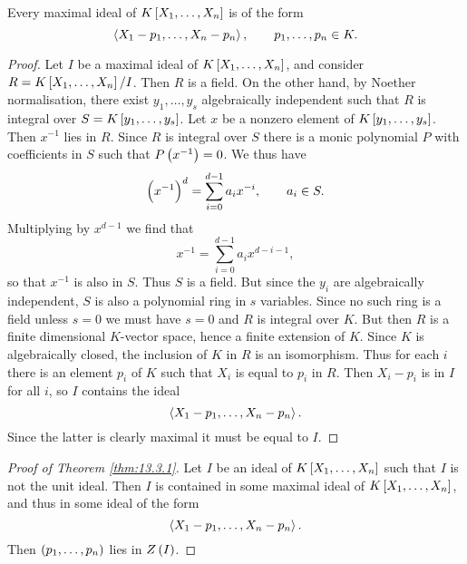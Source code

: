 
\pagebreak

\begin{corollary}
Every maximal ideal of $ K\sbr{X_1, \dots, X_n} $ is of the form
$$ \left\langle X_1 - p_1, \dots, X_n - p_n \right\rangle, \qquad p_1, \dots, p_n \in K. $$
\end{corollary}

\begin{proof}
Let $ I $ be a maximal ideal of $ K\sbr{X_1, \dots, X_n} $, and consider $ R = K\sbr{X_1, \dots, X_n} / I $. Then $ R $ is a field. On the other hand, by Noether normalisation, there exist $ y_1, \dots, y_s $ algebraically independent such that $ R $ is integral over $ S = K\sbr{y_1, \dots, y_s} $. Let $ x $ be a nonzero element of $ K\sbr{y_1, \dots, y_s} $. Then $ x^{-1} $ lies in $ R $. Since $ R $ is integral over $ S $ there is a monic polynomial $ P $ with coefficients in $ S $ such that $ P\br{x^{-1}} = 0 $. We thus have
$$ \br{x^{-1}}^d = \sum_{i = 0}^{d - 1} a_ix^{-i}, \qquad a_i \in S. $$
Multiplying by $ x^{d - 1} $ we find that
$$ x^{-1} = \sum_{i = 0}^{d - 1} a_ix^{d - i - 1}, $$
so that $ x^{-1} $ is also in $ S $. Thus $ S $ is a field. But since the $ y_i $ are algebraically independent, $ S $ is also a polynomial ring in $ s $ variables. Since no such ring is a field unless $ s = 0 $ we must have $ s = 0 $ and $ R $ is integral over $ K $. But then $ R $ is a finite dimensional $ K $-vector space, hence a finite extension of $ K $. Since $ K $ is algebraically closed, the inclusion of $ K $ in $ R $ is an isomorphism. Thus for each $ i $ there is an element $ p_i $ of $ K $ such that $ X_i $ is equal to $ p_i $ in $ R $. Then $ X_i - p_i $ is in $ I $ for all $ i $, so $ I $ contains the ideal
$$ \left\langle X_1 - p_1, \dots, X_n - p_n \right\rangle. $$
Since the latter is clearly maximal it must be equal to $ I $.
\end{proof}

\begin{proof}[Proof of Theorem \ref{thm:13.3.1}]
Let $ I $ be an ideal of $ K\sbr{X_1, \dots, X_n} $ such that $ I $ is not the unit ideal. Then $ I $ is contained in some maximal ideal of $ K\sbr{X_1, \dots, X_n} $, and thus in some ideal of the form
$$ \left\langle X_1 - p_1, \dots, X_n - p_n \right\rangle. $$
Then $ \br{p_1, \dots, p_n} $ lies in $ Z\br{I} $.
\end{proof}

